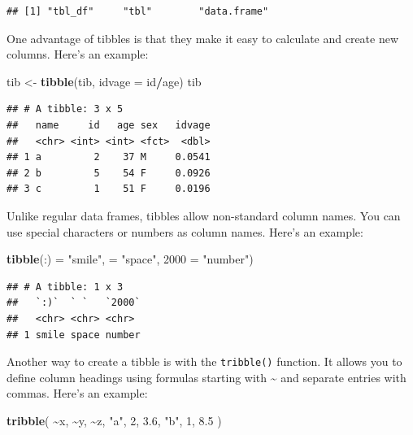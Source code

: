 \documentclass[
]{book}
\newenvironment{Shaded}{\begin{snugshade}}{\end{snugshade}}
\newcommand{\AttributeTok}[1]{\textcolor[rgb]{0.13,0.29,0.53}{#1}}
\newcommand{\DecValTok}[1]{\textcolor[rgb]{0.00,0.00,0.81}{#1}}
\newcommand{\FloatTok}[1]{\textcolor[rgb]{0.00,0.00,0.81}{#1}}
\newcommand{\FunctionTok}[1]{\textcolor[rgb]{0.13,0.29,0.53}{\textbf{#1}}}
\newcommand{\NormalTok}[1]{#1}
\newcommand{\OtherTok}[1]{\textcolor[rgb]{0.56,0.35,0.01}{#1}}
\newcommand{\SpecialCharTok}[1]{\textcolor[rgb]{0.81,0.36,0.00}{\textbf{#1}}}
\newcommand{\StringTok}[1]{\textcolor[rgb]{0.31,0.60,0.02}{#1}}
\begin{document}
\begin{verbatim}
## [1] "tbl_df"     "tbl"        "data.frame"
\end{verbatim}

One advantage of tibbles is that they make it easy to calculate and create new columns. Here's an example:

\begin{Shaded}
\begin{Highlighting}[]
\NormalTok{tib }\OtherTok{\textless{}{-}} \FunctionTok{tibble}\NormalTok{(tib, }\AttributeTok{idvage =}\NormalTok{ id}\SpecialCharTok{/}\NormalTok{age)}
\NormalTok{tib}
\end{Highlighting}
\end{Shaded}

\begin{verbatim}
## # A tibble: 3 x 5
##   name     id   age sex   idvage
##   <chr> <int> <int> <fct>  <dbl>
## 1 a         2    37 M     0.0541
## 2 b         5    54 F     0.0926
## 3 c         1    51 F     0.0196
\end{verbatim}

Unlike regular data frames, tibbles allow non-standard column names. You can use special characters or numbers as column names. Here's an example:

\begin{Shaded}
\begin{Highlighting}[]
\FunctionTok{tibble}\NormalTok{(}\StringTok{\textasciigrave{}}\AttributeTok{:)}\StringTok{\textasciigrave{}} \OtherTok{=} \StringTok{"smile"}\NormalTok{, }\StringTok{\textasciigrave{}}\AttributeTok{ }\StringTok{\textasciigrave{}} \OtherTok{=} \StringTok{"space"}\NormalTok{, }\StringTok{\textasciigrave{}}\AttributeTok{2000}\StringTok{\textasciigrave{}} \OtherTok{=} \StringTok{"number"}\NormalTok{)}
\end{Highlighting}
\end{Shaded}

\begin{verbatim}
## # A tibble: 1 x 3
##   `:)`  ` `   `2000`
##   <chr> <chr> <chr> 
## 1 smile space number
\end{verbatim}

Another way to create a tibble is with the \texttt{tribble()} function. It allows you to define column headings using formulas starting with \textasciitilde{} and separate entries with commas. Here's an example:

\begin{Shaded}
\begin{Highlighting}[]
\FunctionTok{tribble}\NormalTok{(}
    \SpecialCharTok{\textasciitilde{}}\NormalTok{x, }\SpecialCharTok{\textasciitilde{}}\NormalTok{y, }\SpecialCharTok{\textasciitilde{}}\NormalTok{z,}
    \StringTok{"a"}\NormalTok{, }\DecValTok{2}\NormalTok{, }\FloatTok{3.6}\NormalTok{,}
    \StringTok{"b"}\NormalTok{, }\DecValTok{1}\NormalTok{, }\FloatTok{8.5}
\NormalTok{)}
\end{Highlighting}
\end{Shaded}
\end{document}
